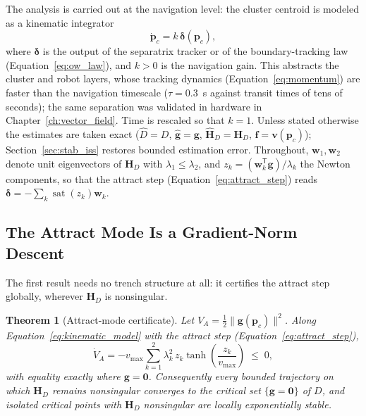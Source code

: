 \documentclass[12pt, letterpaper, oneside]{report}
\newtheorem{theorem}{Theorem}[chapter]
\begin{document}
The analysis is carried out at the navigation level: the cluster centroid
is modeled as a kinematic integrator
\begin{equation}
\dot{\mathbf{p}}_c = k\,\boldsymbol{\delta}(\mathbf{p}_c),
\label{eq:kinematic_model}
\end{equation}
where $\boldsymbol{\delta}$ is the output of the separatrix tracker or of
the boundary-tracking law (Equation~\eqref{eq:ow_law}), and $k>0$ is the
navigation gain. This abstracts the cluster and robot layers, whose
tracking dynamics (Equation~\eqref{eq:momentum}) are faster than the
navigation timescale ($\tau=0.3$~s against transit times of tens of
seconds); the same separation was validated in hardware in
Chapter~\ref{ch:vector_field}. Time is rescaled so that $k=1$. Unless
stated otherwise the estimates are taken exact ($\hat D=D$,
$\hat{\mathbf{g}}=\mathbf{g}$, $\hat{\mathbf{H}}_D=\mathbf{H}_D$,
$\mathbf{f}=\mathbf{v}(\mathbf{p}_c)$); Section~\ref{sec:stab_iss} restores
bounded estimation error. Throughout, $\mathbf{w}_1,\mathbf{w}_2$ denote
unit eigenvectors of $\mathbf{H}_D$ with $\lambda_1\leq\lambda_2$, and
$z_k=(\mathbf{w}_k^{\mathsf T}\mathbf{g})/\lambda_k$ the Newton components,
so that the attract step (Equation~\eqref{eq:attract_step}) reads
$\boldsymbol{\delta}=-\sum_k\operatorname{sat}(z_k)\mathbf{w}_k$.

\subsection{The Attract Mode Is a Gradient-Norm Descent}

The first result needs no trench structure at all: it certifies the
attract step globally, wherever $\mathbf{H}_D$ is nonsingular.

\begin{theorem}[Attract-mode certificate]
\label{thm:attract}
Let $V_A=\tfrac12\lVert\mathbf{g}(\mathbf{p}_c)\rVert^2$. Along
Equation~\eqref{eq:kinematic_model} with the attract step
(Equation~\eqref{eq:attract_step}),
\begin{equation}
\dot V_A = -v_{\max}\sum_{k=1}^2 \lambda_k^2\, z_k\tanh\!\left(\frac{z_k}{v_{\max}}\right) \;\leq\; 0,
\label{eq:VA_dot}
\end{equation}
with equality exactly where $\mathbf{g}=\mathbf{0}$. Consequently every
bounded trajectory on which $\mathbf{H}_D$ remains nonsingular converges
to the critical set $\{\mathbf{g}=\mathbf{0}\}$ of $D$, and isolated
critical points with $\mathbf{H}_D$ nonsingular are locally exponentially
stable.
\end{theorem}
\end{document}
